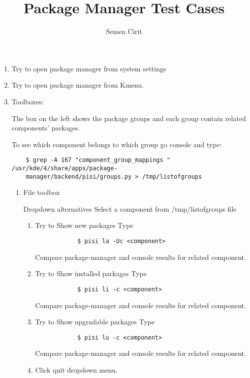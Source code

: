 \documentclass[a4paper,10pt]{article}
\title{Package Manager Test Cases}
\author{Semen Cirit}
\begin{document}
\maketitle

\begin{enumerate}
    \item Try to open package manager from system settings
    \item Try to open package manager from Kmenu.
    \item Toolboxes:

    The box on the left shows the package groups and each group contain related components' packages.

    To see which component belongs to which group go console and type:
    \begin{verbatim}
    $ grep -A 167 "component_group_mappings " /usr/kde/4/share/apps/package-
    manager/backend/pisi/groups.py > /tmp/listofgroups
    \end{verbatim} 
    \begin{enumerate}
        \item File toolbox
    
        Dropdown alternatives
        Select a component from /tmp/listofgroups file
        \begin{enumerate}
            \item Try to Show new packages
            Type
            \begin{verbatim}
            $ pisi la -Uc <component>
            \end{verbatim}
            Compare package-manager and console results for related component.
            \item Try to Show installed packages
            Type
            \begin{verbatim}
            $ pisi li -c <component>
            \end{verbatim}
            Compare package-manager and console results for related component.
    
            \item Try to Show upgradable packages
            Type
            \begin{verbatim}
            $ pisi lu -c <component>
            \end{verbatim}
            Compare package-manager and console results for related component.
    
            \item Click quit dropdown menu. 
    

\end{enumerate}
\end{enumerate}
\end{enumerate}
\end{document}
